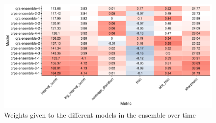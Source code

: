 \documentclass[
]{book}
\begin{document}
\begin{figure}
\includegraphics[width=1\linewidth]{../visualisation/chapter-5-results/ensembles/scenario-baseline/coloured-summarised-scores} \caption{Weights given to the different models in the ensemble over time}\label{fig:ensemble-comparison}
\end{figure}
\end{document}
